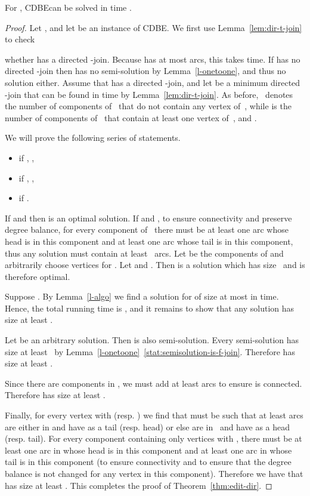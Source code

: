 \documentclass[11pt]{llncs}
\newcommand{\cdbe}{{\sc CDBE}}
\begin{document}
\begin{theorem}\label{thm:edit-dir}
For ,  \cdbe can be
solved in time .
\end{theorem}


\begin{proof}
\begin{sloppypar}
Let  , and let  be an
instance of \cdbe.  We first use Lemma~\ref{lem:dir-t-join} to check
\end{sloppypar}
whether  has a directed -join.  Because  has at most  arcs,
this takes  time.  If  has no directed -join
then  has no semi-solution by Lemma~\ref{l-onetoone}, and thus no
solution either.  
Assume that  has a directed -join, and let  be a minimum directed
-join that can be found in time  by Lemma~\ref{lem:dir-t-join}. 
As before,~ denotes the
number of components of~ that do not contain any vertex of~, while
 is the number of components of~ that contain at least
one vertex of~, 
and . 

We will prove the following series of statements.

\begin{itemize}
\item  if , ,
\item  if , ,
\item  if .
\end{itemize}

If  and  then  is an optimal solution.  If
 and , to ensure connectivity and preserve degree balance, for
every component of~ there must be at least one arc whose head is in this
component and at least one arc whose tail is in this component, thus any
solution must contain at least~ arcs. Let  be the components
of  and arbitrarily choose vertices  for . Let 
and .  Then  is a solution which has size~ and is
therefore optimal.

Suppose .  By Lemma~\ref{l-algo} we find a solution  for
 of size at most  in 
time.  Hence, the total running time is , and it
remains to show that any solution has size at least
. 

Let  be an arbitrary solution. Then  is also semi-solution. Every
semi-solution has size at least~ by Lemma~\ref{l-onetoone}~\ref{stat:semisolution-is-f-join}. Therefore
 has size at least .

Since there are  components in , we must add at least  arcs to
ensure  is connected.  Therefore  has size at least . 

Finally, for every vertex  with 
(resp. ) we find that  must be such that at least  arcs
are either in  and have  as a tail (resp. head) or else are in~ and
have  as a head (resp. tail). For every component containing only vertices
 with , there must be at least one arc in  whose head is in this
component and at least one arc in  whose tail is in this component (to
ensure connectivity and to ensure that the degree balance is not changed for any
vertex in this component).  Therefore we have that  has size at least
. This completes the proof of Theorem~\ref{thm:edit-dir}.
\end{proof}
\end{document}
